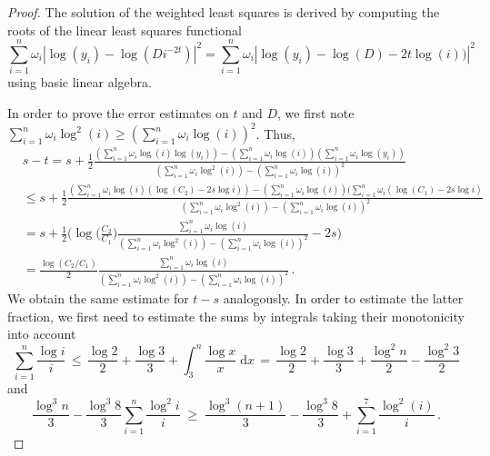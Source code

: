 \documentclass[a4paper]{scrartcl}
\numberwithin{equation}{section}
\begin{document}
\begin{proof} The solution of the weighted least squares is derived by computing the roots of the linear least squares functional
    \begin{equation*}
        \sum_{i=1}^{n} \omega_i | \log(y_i) - \log(D i^{-2t})|^2
        = \sum_{i=1}^{n} \omega_i | \log(y_i) - \log(D) -2t\log(i))|^2
    \end{equation*}
    using basic linear algebra.
    
    In order to prove the error estimates on $t$ and $D$, we first note
    $\sum_{i=1}^{n}\omega_i\log^2(i) \ge (\sum_{i=1}^{n}\omega_i\log(i))^2$.
    Thus,
    \begin{align}
        &s-t
        = s + \frac 12 \frac{(\sum_{i=1}^{n}\omega_i \log(i) \log(y_i)) - (\sum_{i=1}^{n} \omega_i \log(i))(\sum_{i=1}^{n} \omega_i \log(y_i))}{(\sum_{i=1}^{n}\omega_i \log^2(i)) - (\sum_{i=1}^{n}\omega_i \log(i))^2}\nonumber \\
        &\le s + \frac 12 \frac{(\sum_{i=1}^{n}\omega_i \log(i) ( \log(C_2) - 2s\log i )) - (\sum_{i=1}^{n} \omega_i \log(i))(\sum_{i=1}^{n} \omega_i (\log(C_1) - 2s\log i)}{(\sum_{i=1}^{n}\omega_i \log^2(i)) - (\sum_{i=1}^{n}\omega_i \log(i))^2}\nonumber \\
        &= s + \frac 12
        \Big(
        \log\Big(\frac{C_2}{C_1}\Big)\frac{\sum_{i=1}^{n}\omega_i \log(i)}{(\sum_{i=1}^{n}\omega_i \log^2(i)) - (\sum_{i=1}^{n}\omega_i \log(i))^2}
        -2s\Big)\nonumber \\
        &= \frac{\log(C_2/C_1)}{2}
        \frac{\sum_{i=1}^{n}\omega_i \log(i)}{(\sum_{i=1}^{n}\omega_i \log^2(i)) - (\sum_{i=1}^{n}\omega_i \log(i))^2}\label{eq:alligatoah} \,.
    \end{align}
    We obtain the same estimate for $t-s$ analogously.
    In order to estimate the latter fraction, we first need to estimate the sums by integrals taking their monotonicity into account
    \begin{equation}\label{eq:overkill1}
        \sum_{i=1}^{n} \frac{\log i}{i}
        \,\le\, \frac{\log 2}{2} + \frac{\log 3}{3} + \int_{3}^{n}\frac{\log x}{x}\;\mathrm dx
        \,=\, \frac{\log 2}{2} + \frac{\log 3}{3} + \frac{\log^2 n}{2} - \frac{\log^2 3}{2}
    \end{equation}
    and
    \begin{equation}\label{eq:overkill2}
        \frac{\log^3 n}{3} - \frac{\log^3 8}{3}
\sum_{i=1}^{n} \frac{\log^2 i}{i}
        \;\ge\;
        \frac{\log^3 (n+1)}{3} - \frac{\log^3 8}{3}
        + \sum_{i=1}^{7}\frac{\log^2 (i)}{i} \,.

\end{equation}
\end{proof}
\end{document}
